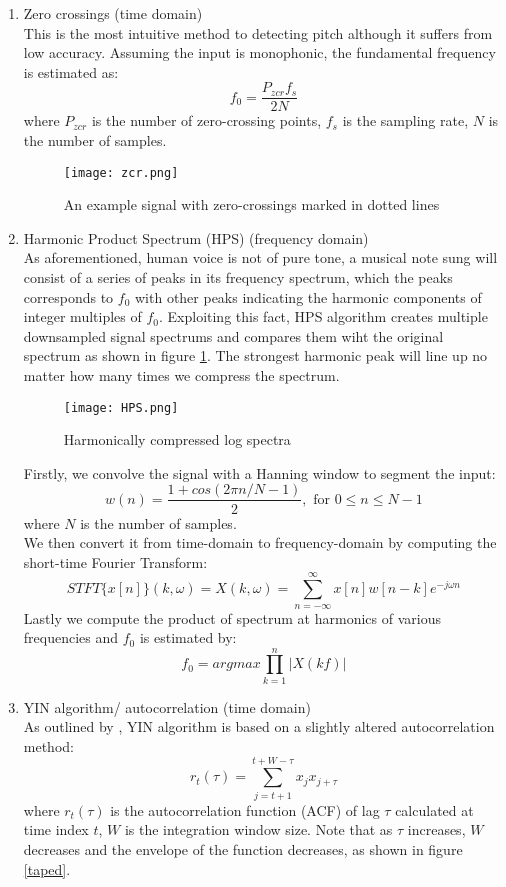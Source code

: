 \begin{enumerate}
	\item Zero crossings (time domain)\\
	This is the most intuitive method to detecting pitch although it suffers from low accuracy.
	Assuming the input is monophonic, the fundamental frequency is estimated as:
	\[f_0 = \frac{P_{zcr}f_s}{2N}\]
	where $P_{zcr}$ is the number of zero-crossing points, $f_s$ is the sampling rate,
	$N$ is the number of samples.
	\begin{figure}[h]
		\centering
		\texttt{[image: zcr.png]}
		\caption{An example signal with zero-crossings marked in dotted lines }
	\end{figure}

	\item Harmonic Product Spectrum (HPS) (frequency domain)\\
	As aforementioned, human voice is not of pure tone, a musical note sung will consist of a series of peaks in its frequency spectrum,
	which the peaks corresponds to $f_0$ with other peaks indicating the harmonic components of integer multiples of $f_0$. 
	Exploiting this fact, HPS algorithm creates multiple downsampled signal spectrums and compares them wiht the original spectrum as shown in figure 
	\ref{HPS}. The strongest harmonic peak will line up no matter how many times we compress the spectrum.
	
	\begin{figure}[h]
		\centering
		\texttt{[image: HPS.png]}
		\caption{Harmonically compressed log spectra }
		\label{HPS}
	\end{figure}
	
	Firstly, we convolve the signal with a Hanning window to segment the input:
	\[w(n) = \frac{1+cos(2\pi n/N-1)}{2}, \text{ for } 0 \leq n \leq N-1\] where $N$ is the number of samples.\\
	We then convert it from time-domain to frequency-domain by computing the short-time Fourier Transform:
	\[STFT \{x[n]\}(k,\omega) = X(k,\omega )= \sum _{n=-\infty }^{\infty }x[n]w[n-k]e^{-j\omega n}\]
	Lastly we compute the product of spectrum at harmonics of various frequencies and $f_0$ is estimated by:
	\[f_0 = argmax\prod_{k=1}^{n}|X(kf)|\] 

	\item YIN algorithm/ autocorrelation (time domain)\\
	As outlined by \cite{yin}, YIN algorithm is based on a slightly altered autocorrelation method:
	\[r_t(\tau)=\sum_{j=t+1}^{t+W-\tau}x_j x_{j+\tau}\]
	where $r_t(\tau)$ is the autocorrelation function (ACF) of lag $\tau$ calculated at time index $t$, $W$ is the integration
	window size. Note that as $\tau$ increases, $W$ decreases and the envelope of the function decreases, as shown in figure 
	\ref{taped}.


\end{enumerate}
